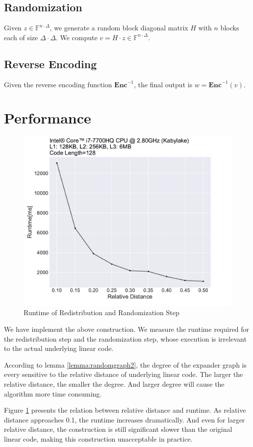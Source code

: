 \subsection{Randomization}

Given $z \in \mathbb{F}^{n \cdot \Delta}$, we generate a random block diagonal matrix $H$ with $n$ blocks each of size $\Delta \cdot \Delta$. We compute $v = H \cdot z \in \mathbb{F}^{n \cdot \Delta}$.

\subsection{Reverse Encoding}

Given the reverse encoding function $\textbf{Enc}^{-1}$, the final output is $w = \textbf{Enc}^{-1}(v)$.

\section{Performance}

\begin{figure}[h]
    \centering
    \includegraphics[width=1\textwidth]{graph/degree.pdf}
    \caption{Runtime of Redistribution and Randomization Step}
    \label{fig:degree}
\end{figure}


We have implement the above construction. We measure the runtime required for the redistribution step and the randomization step, whose execution is irrelevant to the actual underlying linear code.


According to lemma \ref{lemma:randomgraph2}, the degree of the expander graph is every sensitive to the relative distance of underlying linear code. The larger the relative distance, the smaller the degree. And larger degree will cause the algorithm more time consuming.

Figure \ref{fig:degree} presents the relation between relative distance and runtime. As relative distance approaches 0.1, the runtime increases dramatically. And even for larger relative distance, the construction is still significant slower than the original linear code, making this construction unacceptable in practice.